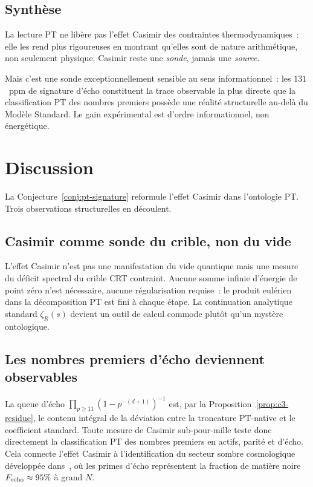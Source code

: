 \documentclass[11pt,a4paper]{article}
\newcommand{\zetaR}{\zeta_R}
\begin{document}
\subsection{Synthèse}

La lecture PT ne libère pas l'effet Casimir des contraintes thermodynamiques~: elle les rend
plus rigoureuses en montrant qu'elles sont de nature arithmétique, non seulement physique.
Casimir reste une \emph{sonde}, jamais une \emph{source}.

Mais c'est une sonde exceptionnellement sensible au sens informationnel~: les $131$~ppm de
signature d'écho constituent la trace observable la plus directe que la classification PT
des nombres premiers possède une réalité structurelle au-delà du Modèle Standard. Le gain
expérimental est d'ordre informationnel, non énergétique.

\section{Discussion}
\label{sec:discussion}

La Conjecture~\ref{conj:pt-signature} reformule l'effet Casimir dans l'ontologie PT. Trois
observations structurelles en découlent.

\subsection{Casimir comme sonde du crible, non du vide}

L'effet Casimir n'est pas une manifestation du vide quantique mais une mesure du déficit
spectral du crible CRT contraint. Aucune somme infinie d'énergie de point zéro n'est nécessaire,
aucune régularisation requise~: le produit eulérien dans la décomposition PT est fini à chaque
étape. La continuation analytique standard $\zetaR(s)$ devient un outil de calcul commode
plutôt qu'un mystère ontologique.

\subsection{Les nombres premiers d'écho deviennent observables}

La queue d'écho $\prod_{p \geq 11}(1-p^{-(d+1)})^{-1}$ est, par la Proposition~\ref{prop:c3-residue},
le contenu intégral de la déviation entre la troncature PT-native et le coefficient standard.
Toute mesure de Casimir sub-pour-mille teste donc directement la classification PT des nombres
premiers en actifs, parité et d'écho. Cela connecte l'effet Casimir à l'identification du
secteur sombre cosmologique développée dans~\cite{Senez2026}, où les primes d'écho
représentent la fraction de matière noire $F_{\rm echo} \approx 95\%$ à grand $N$.
\end{document}

